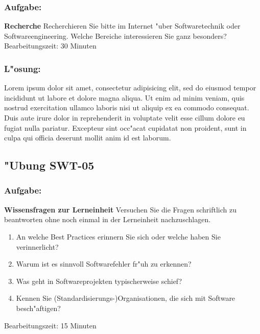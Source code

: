 \subsubsection*{Aufgabe:}

\begin{framed}
\textbf{Recherche}
\smallbreak
Recherchieren Sie bitte im Internet "uber Softwaretechnik oder Softwareengineering. Welche Bereiche interessieren Sie ganz besonders?
\bigbreak
\small Bearbeitungszeit: 30 Minuten
\end{framed}
\bigbreak
\bigbreak
\subsubsection*{L"osung:}
Lorem ipsum dolor sit amet, consectetur adipisicing elit, sed do eiusmod tempor incididunt ut labore et dolore magna aliqua. Ut enim ad minim veniam, quis nostrud exercitation ullamco laboris nisi ut aliquip ex ea commodo consequat. Duis aute irure dolor in reprehenderit in voluptate velit esse cillum dolore eu fugiat nulla pariatur. Excepteur sint occ"acat cupidatat non proident, sunt in culpa qui officia deserunt mollit anim id est laborum.

\newpage
\subsection{"Ubung SWT-05}
\subsubsection*{Aufgabe:}

\begin{framed}
\textbf{Wissensfragen zur Lerneinheit}
\smallbreak
Versuchen Sie die Fragen schriftlich zu beantworten ohne noch einmal in der Lerneinheit nachzuschlagen.
\begin{enumerate}
\item An welche Best Practices erinnern Sie sich oder welche haben Sie verinnerlicht?
\item Warum ist es sinnvoll Softwarefehler fr"uh zu erkennen?
\item Was geht in Softwareprojekten typischerweise schief?
\item Kennen Sie (Standardisierungs-)Organisationen, die sich mit Software besch"aftigen?
\end{enumerate}
\bigbreak
\small Bearbeitungszeit: 15 Minuten
\end{framed}
\bigbreak
\bigbreak

